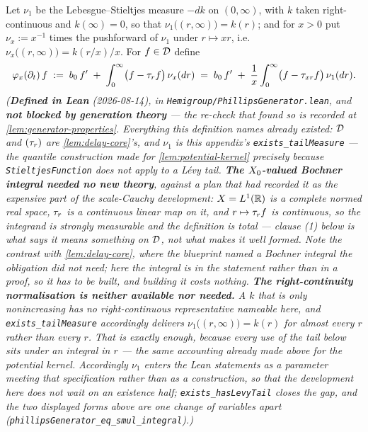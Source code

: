 \begin{definition}\label{def:phillips-generator}
\leanok
Let $\nu_1$ be the Lebesgue--Stieltjes measure $-dk$ on $(0,\infty)$, with $k$ taken
right-continuous and $k(\infty) = 0$, so that $\nu_1\bigl((r,\infty)\bigr) = k(r)$; and for
$x > 0$ put $\nu_x := x^{-1}$ times the pushforward of $\nu_1$ under $r \mapsto xr$, i.e.\
$\nu_x\bigl((r,\infty)\bigr) = k(r/x)/x$. For $f \in \mathcal{D}$ define
\[
  \varphi_x(\partial_t)\, f \;:=\; b_0\, f' \;+\; \int_0^\infty \bigl(f - \tau_r f\bigr)\,\nu_x(dr)
  \;=\; b_0\, f' \;+\; \frac{1}{x}\int_0^\infty \bigl(f - \tau_{xr} f\bigr)\,\nu_1(dr).
\]
\statusT\quad\emph{(\textbf{Defined in Lean} (2026-08-14), in
\texttt{Hemigroup/PhillipsGenerator.lean}, and \textbf{not blocked by generation theory} --- the
re-check that found so is recorded at \ref{lem:generator-properties}. Everything this definition
names already existed: $\mathcal{D}$ and $(\tau_r)$ are \ref{lem:delay-core}'s, and $\nu_1$ is this appendix's
\texttt{exists\_tailMeasure} --- the quantile construction made for \ref{lem:potential-kernel}
precisely because \texttt{StieltjesFunction} does not apply to a L\'evy tail.
\textbf{The $X_0$-valued Bochner integral needed no new theory}, against a plan that had recorded
it as the expensive part of the scale-Cauchy development: $X = L^1(\mathbb{R})$ is a complete normed real space, $\tau_r$ is
a continuous linear map on it, and $r \mapsto \tau_rf$ is continuous, so the integrand is strongly
measurable and the definition is \emph{total} --- clause (1) below is what says it means something
on $\mathcal{D}$, not what makes it well formed. Note the contrast with \ref{lem:delay-core}, where the
blueprint named a Bochner integral the obligation did not need; here the integral is in the
statement rather than in a proof, so it has to be built, and building it costs nothing.
\textbf{The right-continuity normalisation is neither available nor needed.} A $k$ that is only
nonincreasing has no right-continuous representative nameable here, and
\texttt{exists\_tailMeasure} accordingly delivers $\nu_1\bigl((r,\infty)\bigr) = k(r)$ for
\emph{almost every} $r$ rather than every $r$. That is exactly enough, because every use of the
tail below sits under an integral in $r$ --- the same accounting already made above for the
potential kernel. Accordingly $\nu_1$ enters the Lean statements as a \emph{parameter} meeting
that specification rather than as a construction, so that the development here does not wait on an
existence half; \texttt{exists\_hasLevyTail} closes the gap, and the two displayed forms above are
one change of variables apart (\texttt{phillipsGenerator\_eq\_smul\_integral}).)}
\end{definition}

